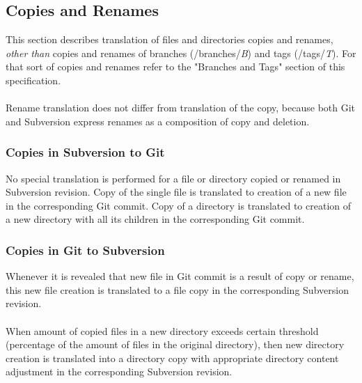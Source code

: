 \subsection{Copies and Renames}
This section describes translation of files and directories copies and renames, \emph{other than} copies and renames of 
branches (/branches/\emph{B}) and tags (/tags/\emph{T}). For that sort of copies and renames refer to the "Branches and Tags" 
section of this specification.\\\\
Rename translation does not differ from translation of the copy, because both Git and Subversion
express renames as a composition of copy and deletion.%

\subsubsection{Copies in Subversion to Git}
No special translation is performed for a file or directory copied or renamed in Subversion revision. Copy of the single file is translated 
to creation of a new file in the corresponding Git commit. Copy of a directory is translated to creation of a new directory with all its children
in the corresponding Git commit.

\subsubsection{Copies in Git to Subversion}
Whenever it is revealed that new file in Git commit is a result of copy or rename, this new file creation is translated to a file copy in the 
corresponding Subversion revision.\\\\ 
When amount of copied files in a new directory exceeds certain threshold (percentage of the amount of files in the original directory), then new directory
creation is translated into a directory copy with appropriate directory content adjustment in the corresponding Subversion revision.